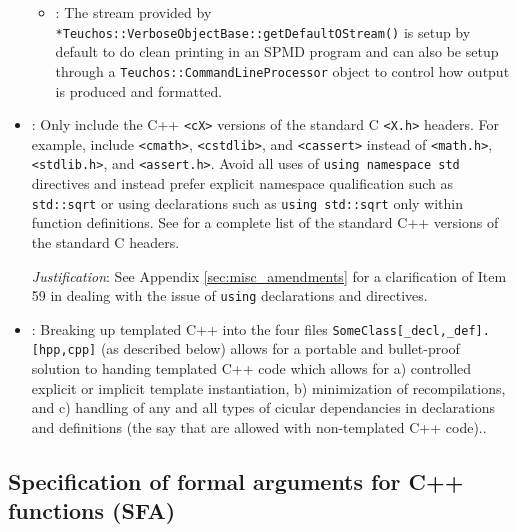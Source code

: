 \begin{itemize}
\begin{itemize}
{}\item\GCGTeuchosVerboseObjectBaseDefaultOStream: The stream provided by
{}\texttt{*Teuchos\-::Verbose\-Object\-Base\-::get\-Default\-OStream()} is
setup by default to do clean printing in an SPMD program and can also be setup
through a {}\texttt{Teuchos\-::Command\-Line\-Processor} object to control how
output is produced and formatted.

\end{itemize}

{}\item\GCGStandardCppHeaders: Only include the C++ {}\texttt{<cX>} versions
of the standard C {}\texttt{<X.h>} headers.  For example, include
{}\texttt{<cmath>}, {}\texttt{<cstdlib>}, and {}\texttt{<cassert>} instead of
{}\texttt{<math.h>}, {}\texttt{<stdlib.h>}, and {}\texttt{<assert.h>}.  Avoid
all uses of {}\texttt{using namespace std} directives and instead prefer
explicit namespace qualification such as {}\texttt{std::sqrt} or using
declarations such as {}\texttt{using std::sqrt} only within function
definitions.  See {}\cite[Section 16.1.2]{stroustrup97} for a complete list of
the standard C++ versions of the standard C headers.

{}\textit{Justification}: See Appendix {}\ref{sec:misc_amendments} for a
clarification of Item 59 in {}\cite{C++CodingStandards05} dealing with the
issue of {}\texttt{using} declarations and directives.

{}\item\GCGTemplateHeaders: Breaking up templated C++ into the four
files {}\texttt{SomeClass[\_decl,\_def].[hpp,cpp]} (as described
below) allows for a portable and bullet-proof solution to handing
templated C++ code which allows for a) controlled explicit or implicit
template instantiation, b) minimization of recompilations, and c)
handling of any and all types of cicular dependancies in declarations
and definitions (the say that are allowed with non-templated C++
code)..

\end{itemize}


%
\subsection{Specification of formal arguments for C++ functions (SFA)}
\label{sec:func_arguments}
%


